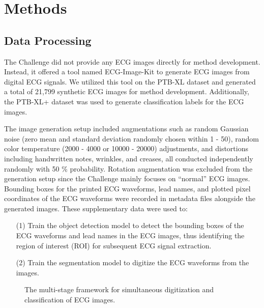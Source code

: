 \section{Methods}
\label{sec:methods}


\subsection{Data Processing}
\label{subsec:data_processing}


The Challenge did not provide any ECG images directly for method development. Instead, it offered a tool named ECG-Image-Kit \cite{Shivashankara_2024_ECG, ECGImageKit2024_GitHub} to generate ECG images from digital ECG signals. We utilized this tool on the PTB-XL dataset \cite{wagner2020ptb_xl} and generated a total of 21,799 synthetic ECG images for method development. Additionally, the PTB-XL+ dataset \cite{Strodthoff_2023} was used to generate classification labels for the ECG images.

The image generation setup included augmentations such as random Gaussian noise (zero mean and standard deviation randomly chosen within 1 - 50), random color temperature (2000 - 4000 or 10000 - 20000) adjustments, and distortions including handwritten notes, wrinkles, and creases, all conducted independently randomly with 50 \% probability. Rotation augmentation was excluded from the generation setup since the Challenge mainly focuses on ``normal'' ECG images. Bounding boxes for the printed ECG waveforms, lead names, and plotted pixel coordinates of the ECG waveforms were recorded in metadata files alongside the generated images. These supplementary data were used to:
\begin{itemize}
\item[(1)] Train the object detection model to detect the bounding boxes of the ECG waveforms and lead names in the ECG images, thus identifying the region of interest (ROI) for subsequent ECG signal extraction.
\item[(2)] Train the segmentation model to digitize the ECG waveforms from the images.
\end{itemize}

\newif\ifFrameworkFigBox
\FrameworkFigBoxtrue

\begin{figure}[!ht]
\centering

\caption{The multi-stage framework for simultaneous digitization and classification of ECG images.}
\label{fig:multi-stage-framework}
\end{figure}

